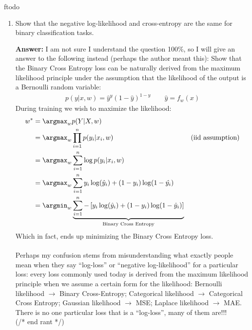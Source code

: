 ƒtodo\documentclass{article}
\newenvironment{QandA}{\begin{enumerate}[label=\arabic*.]}{\end{enumerate}}
\newenvironment{answer}{\par\normalfont \textbf{Answer:}}{}
\newcommand{\g}{\vert}
\begin{document}
\begin{QandA}
    \item Show that the negative log-likelihood and cross-entropy are the same for binary classification tasks.
    \begin{answer}
        I am not sure I understand the question 100\%, so I will give an answer to the following instead (perhaps the author meant this): Show that the Binary Cross Entropy loss can be naturally derived from the maximum likelihood principle under the assumption that the likelihood of the output is a Bernoulli random variable:
        \begin{align*}
            p(y \g x, w) = \hat{y}^y (1-\hat{y})^{1-y} \quad\quad \hat{y} = f_w(x)
        \end{align*}
        During training we wish to maximize the likelihood:
        \begin{align*}
            w^* &= \argmax_{w} p(Y \g X, w) \\
            &= \argmax_{w} \prod_{i=1}^n p(y_i \g x_i, w) &\text{(iid assumption)} \\
            &= \argmax_{w} \sum_{i=1}^n \log p(y_i \g x_i, w) \\
            &= \argmax_{w} \sum_{i=1}^n y_i\log(\hat{y}_i) + (1-y_i)\log(1-\hat{y_i}) \\
            &= \argmin_{w} \underbrace{\sum_{i=1}^n - \left[ y_i\log(\hat{y}_i) + (1-y_i)\log(1-\hat{y}_i)\right]}_{\text{Binary Cross Entropy}}
        \end{align*}
        Which in fact, ends up minimizing the Binary Cross Entropy loss. \\\\
        Perhaps my confusion stems from misunderstanding what exactly people mean when they say ``log-loss'' or ``negative log-likelihood'' for a particular loss: every loss commonly used today is derived from the maximum likelihood principle when we assume a certain form for the likelihood: Bernoulli likelihood $\rightarrow$ Binary Cross-Entropy; Categorical likelihood $\rightarrow$ Categorical Cross Entropy; Gaussian likelihood $\rightarrow$ MSE; Laplace likelihood $\rightarrow$ MAE. There is no one particular loss that is a ``log-loss'', many of them are!!!\\
        (/* end rant */)
    \end{answer}


\end{QandA}
\end{document}
